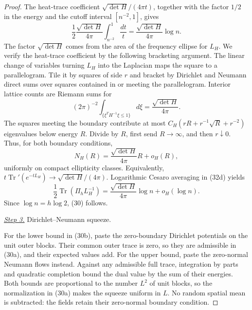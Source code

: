 \documentclass{aomart}
\theoremstyle{definition}
\newcommand{\1}{\mathbf 1}
\begin{document}
\begin{proof}
The heat-trace coefficient $\sqrt{\det H}/(4\pi t)$, together with
the factor $1/2$ in the energy and the cutoff interval $[n^{-2},1]$,
gives
\begin{equation*}
\frac12\frac{\sqrt{\det H}}{4\pi}
\int_{n^{-2}}^1\frac{dt}{t}
=\frac{\sqrt{\det H}}{4\pi}\log n.
\end{equation*}
The factor $\sqrt{\det H}$ comes from the area of the frequency
ellipse for $L_H$.  We verify the heat-trace coefficient by the
following bracketing argument.  The linear change of variables turning
$L_H$ into the
Laplacian maps the square to a parallelogram.  Tile it by squares of side
$r$ and bracket by Dirichlet and Neumann direct sums over squares
contained in or meeting the parallelogram.  Interior lattice counts are
Riemann sums for
\begin{equation*}
(2\pi)^{-2}\int_ {\{\xi^TH^{-1}\xi\leq1\}}d\xi
=\frac{\sqrt{\det H}}{4\pi}.
\end{equation*}
The squares meeting the boundary contribute at most
$C_ H(rR+r^{-1}\sqrt R+r^{-2})$ eigenvalues below energy $R$.
Divide by $R$, first send $R\to\infty$, and then $r\downarrow0$.
Thus, for both boundary conditions,
\begin{equation}
N_ H(R)=\frac{\sqrt{\det H}}{4\pi}R+o_ H(R),
\tag{32e}
\end{equation}
uniformly on compact ellipticity classes.  Equivalently,
$t\operatorname {Tr}'(e^{-tL_ H})\to\sqrt{\det H}/(4\pi)$.
Logarithmic Cesaro averaging in (32d) yields
\begin{equation}
\frac12\operatorname {Tr}(\Pi_ hL_ H^{-1})
=\frac{\sqrt{\det H}}{4\pi}\log n+o_ H(\log n).
\tag{32}
\end{equation}
Since $\log n=h\log2$, (30) follows.

\smallskip\noindent
\underline{\textit{Step 3.}} Dirichlet--Neumann squeeze.

For the lower bound in (30b), paste the zero-boundary Dirichlet
potentials on the unit outer blocks.  Their common outer trace is
zero, so they are admissible in (30a), and their expected values add.
For the upper bound, paste the zero-normal Neumann flows instead.
Against any admissible full trace, integration by parts and quadratic
completion bound the dual value by the sum of their energies.  Both
bounds are proportional to the number $L^2$ of unit blocks, so the
normalization in (30a) makes the squeeze uniform in $L$.  No random
spatial mean is subtracted: the fields retain their zero-normal
boundary condition.


\end{proof}
\end{document}
